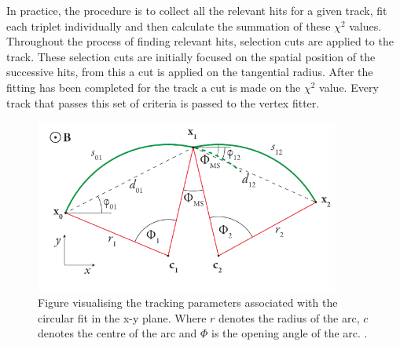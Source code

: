 In practice, the procedure is to collect all the relevant hits for a given track, fit each triplet individually and then calculate the summation of these $\chi^2$ values. Throughout the process of finding relevant hits, selection cuts are applied to the track.
These selection cuts are initially focused on the spatial position of the successive hits, from this a cut is applied on the tangential radius. After the fitting has been completed for the track a cut is made on the $\chi^2$ value.
Every track that passes this set of criteria is passed to the vertex fitter.
\begin{figure}
    \centering
    \includegraphics[width=10cm]{fig/tracking/bending.PNG}
    \caption{Figure visualising the tracking parameters associated with the circular fit in the x-y plane. Where $r$ denotes the radius of the arc, $c$ denotes the centre of the arc and $\Phi$ is the opening angle of the arc. \cite{berger2017new}.}
    \label{fig:bend}
\end{figure}